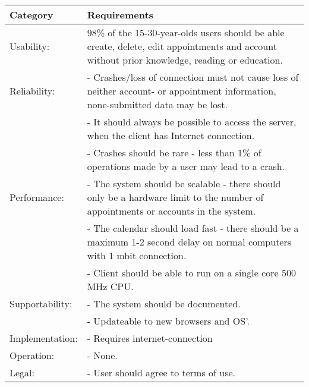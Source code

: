 {\tabulinesep=1.2mm
\begin{tabu}{ | p{3cm} | p{13cm} |}
    \hline
    Category	 			& 		Requirements \\\hline
    Usability:	  			& 		98\% of the 15-30-year-olds users should be able create, delete, edit appointments and account without prior knowledge, reading or education. \\\hline
    Reliability: 			& 		- Crashes/loss of connection must not cause loss of neither account- or appointment information, none-submitted data may be lost. \\
							&		- It should always be possible to access the server, when the client has Internet connection.\\
							&		- Crashes should be rare - less than 1\% of operations made by a user may lead to a crash. \\ \hline
	Performance:			&		- The system should be scalable - there should only be a hardware limit to the number of appointments or accounts in the system.\\
							&		- The calendar should load fast - there should be a maximum 1-2 second delay on normal computers with 1 mbit connection.\\
							&		- Client should be able to run on a single core 500 MHz CPU.\\ \hline
    Supportability: 		& 		- The system should be documented.  \\
    						&		- Updateable to new browsers and OS'. \\ \hline
	Implementation: 		&		- Requires internet-connection\\\hline
	Operation:				&	 	- None. \\\hline
	Legal:					&		- User should agree to terms of use.\\
\end{tabu}
}
